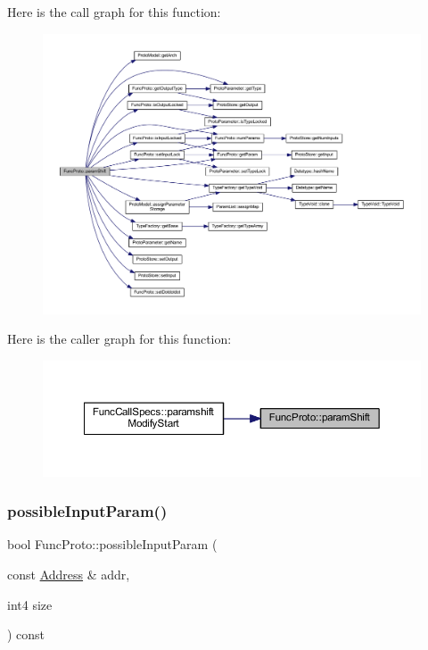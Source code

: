 Here is the call graph for this function\+:
\nopagebreak
\begin{figure}[H]
\begin{center}
\leavevmode
\includegraphics[width=350pt]{class_func_proto_a75f9569f65cd6472f80d3e85d8453ced_cgraph}
\end{center}
\end{figure}
Here is the caller graph for this function\+:
\nopagebreak
\begin{figure}[H]
\begin{center}
\leavevmode
\includegraphics[width=350pt]{class_func_proto_a75f9569f65cd6472f80d3e85d8453ced_icgraph}
\end{center}
\end{figure}
\mbox{\label{class_func_proto_a59ed6ca81a4b601ae81f4080a5bf89fa}} 
\subsubsection{\texorpdfstring{possibleInputParam()}{possibleInputParam()}}
{\footnotesize\ttfamily bool Func\+Proto\+::possible\+Input\+Param (\begin{DoxyParamCaption}\item[{const \mbox{\hyperlink{class_address}{Address}} \&}]{addr,  }\item[{int4}]{size }\end{DoxyParamCaption}) const}



